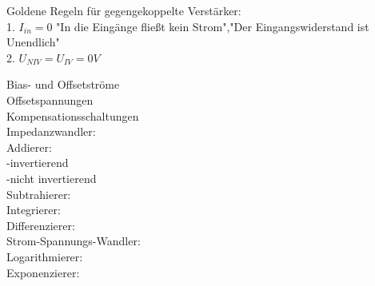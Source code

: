 \documentclass[A4]{scrartcl}
\begin{document}
  Goldene Regeln für gegengekoppelte Verstärker:\\
  1. $I_{in} = 0$ "In die Eingänge fließt kein Strom","Der Eingangswiderstand ist Unendlich"\\
  2. $U_{NIV} = U_{IV} = 0V$ 

  Bias- und Offsetströme\\
  Offsetspannungen\\
  Kompensationsschaltungen\\

  Impedanzwandler:\\
  Addierer:\\
   -invertierend\\
   -nicht invertierend\\
  Subtrahierer:\\
  Integrierer:\\
  Differenzierer:\\
  Strom-Spannungs-Wandler:\\
  Logarithmierer:\\
  Exponenzierer:\\
  
\end{document}
